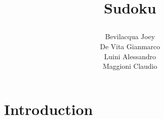 \documentclass[]{usiinfprospectus}
\author{Bevilacqua Joey \\[3pt] De Vita Gianmarco  \\[3pt] Luini Alessandro  \\[3pt] Maggioni Claudio}
\title{\centerline{Sudoku}}
\begin{document}
\maketitle
\tableofcontents
\newpage
\section{Introduction} \label{introduction}



\end{document}
